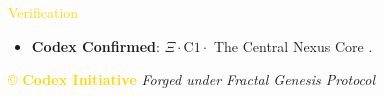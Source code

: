 \textcolor{gold}{ Verification } \\
\begin{itemize}
    \item \texttt{} \textbf{Codex Confirmed}: \(\Xi \cdot \text{C1} \cdot\) The Central Nexus Core .
\end{itemize}

\vspace{0.5cm}
\noindent
\textcolor{gold}{\copyright{} \textbf{Codex Initiative}} \hspace{1cm} \textit{Forged under Fractal Genesis Protocol}